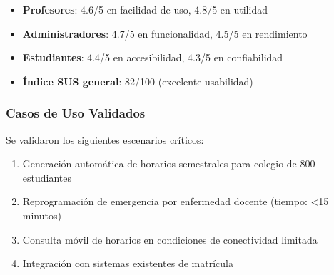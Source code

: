 \begin{itemize}
\item \textbf{Profesores}: 4.6/5 en facilidad de uso, 4.8/5 en utilidad
\item \textbf{Administradores}: 4.7/5 en funcionalidad, 4.5/5 en rendimiento
\item \textbf{Estudiantes}: 4.4/5 en accesibilidad, 4.3/5 en confiabilidad
\item \textbf{Índice SUS general}: 82/100 (excelente usabilidad)
\end{itemize}

\subsubsection{Casos de Uso Validados}

Se validaron los siguientes escenarios críticos:

\begin{enumerate}
\item Generación automática de horarios semestrales para colegio de 800 estudiantes
\item Reprogramación de emergencia por enfermedad docente (tiempo: <15 minutos)
\item Consulta móvil de horarios en condiciones de conectividad limitada
\item Integración con sistemas existentes de matrícula
\end{enumerate}